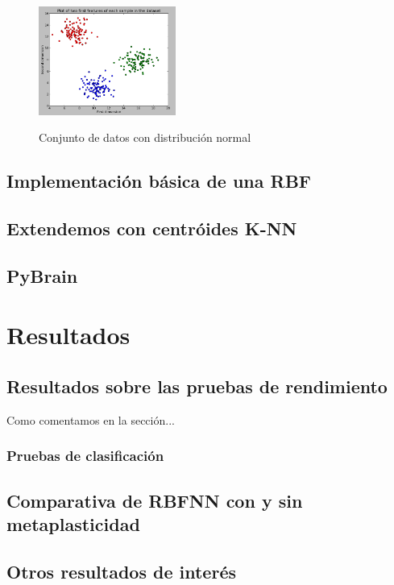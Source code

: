 \documentclass[10pt,a4paper, twocolumn]{report}
\begin{document}
\begin{figure}[!h]{}
    \centering
    \includegraphics[width=0.4\textwidth]{img/clusteredData1.png}
    \label{fig:clusteredData1}
    \caption{Conjunto de datos con distribución normal}
\end{figure}
\section{Implementación básica de una RBF}

\section{Extendemos con centróides K-NN}
\section{PyBrain}


\chapter{Resultados}
\section{Resultados sobre las pruebas de rendimiento}
Como comentamos en la sección... 
\subsection{Pruebas de clasificación}
\section{Comparativa de RBFNN con y sin metaplasticidad}
\section{Otros resultados de interés}
\end{document}
